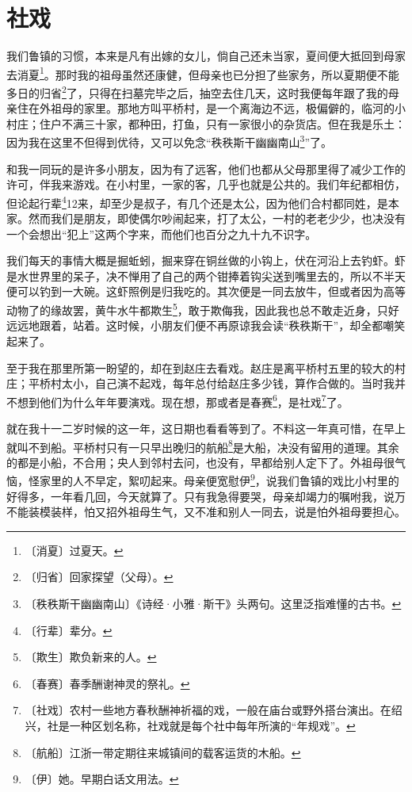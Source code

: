 \documentclass[12pt,UTF-8,openany]{ctexbook}
\begin{document}
\chapter{社戏}

\begin{large}
    
    我们鲁镇的习惯，本来是凡有出嫁的女儿，倘自己还未当家，夏间便大抵回到母家去消夏\footnote{〔消夏〕过夏天。}。那时我的祖母虽然还康健，但母亲也已分担了些家务，所以夏期便不能多日的归省\footnote{〔归省〕回家探望（父母）。}了，只得在扫墓完毕之后，抽空去住几天，这时我便每年跟了我的母亲住在外祖母的家里。那地方叫平桥村，是一个离海边不远，极偏僻的，临河的小村庄；住户不满三十家，都种田，打鱼，只有一家很小的杂货店。但在我是乐土：因为我在这里不但得到优待，又可以免念“秩秩斯干幽幽南山\footnote{〔秩秩斯干幽幽南山〕《诗经·小雅·斯干》头两句。这里泛指难懂的古书。}”了。
    
    和我一同玩的是许多小朋友，因为有了远客，他们也都从父母那里得了减少工作的许可，伴我来游戏。在小村里，一家的客，几乎也就是公共的。我们年纪都相仿，但论起行辈\footnote{〔行辈〕辈分。}12来，却至少是叔子，有几个还是太公，因为他们合村都同姓，是本家。然而我们是朋友，即使偶尔吵闹起来，打了太公，一村的老老少少，也决没有一个会想出“犯上”这两个字来，而他们也百分之九十九不识字。
    
    我们每天的事情大概是掘蚯蚓，掘来穿在铜丝做的小钩上，伏在河沿上去钓虾。虾是水世界里的呆子，决不惮用了自己的两个钳捧着钩尖送到嘴里去的，所以不半天便可以钓到一大碗。这虾照例是归我吃的。其次便是一同去放牛，但或者因为高等动物了的缘故罢，黄牛水牛都欺生\footnote{〔欺生〕欺负新来的人。}，敢于欺侮我，因此我也总不敢走近身，只好远远地跟着，站着。这时候，小朋友们便不再原谅我会读“秩秩斯干”，却全都嘲笑起来了。
    
    至于我在那里所第一盼望的，却在到赵庄去看戏。赵庄是离平桥村五里的较大的村庄；平桥村太小，自己演不起戏，每年总付给赵庄多少钱，算作合做的。当时我并不想到他们为什么年年要演戏。现在想，那或者是春赛\footnote{〔春赛〕春季酬谢神灵的祭礼。}，是社戏\footnote{〔社戏〕农村一些地方春秋酬神祈福的戏，一般在庙台或野外搭台演出。在绍兴，社是一种区划名称，社戏就是每个社中每年所演的“年规戏”。}了。
    
    就在我十一二岁时候的这一年，这日期也看看等到了。不料这一年真可惜，在早上就叫不到船。平桥村只有一只早出晚归的航船\footnote{〔航船〕江浙一带定期往来城镇间的载客运货的木船。}是大船，决没有留用的道理。其余的都是小船，不合用；央人到邻村去问，也没有，早都给别人定下了。外祖母很气恼，怪家里的人不早定，絮叨起来。母亲便宽慰伊\footnote{〔伊〕她。早期白话文用法。}，说我们鲁镇的戏比小村里的好得多，一年看几回，今天就算了。只有我急得要哭，母亲却竭力的嘱咐我，说万不能装模装样，怕又招外祖母生气，又不准和别人一同去，说是怕外祖母要担心。
    

\end{large}
\end{document}

